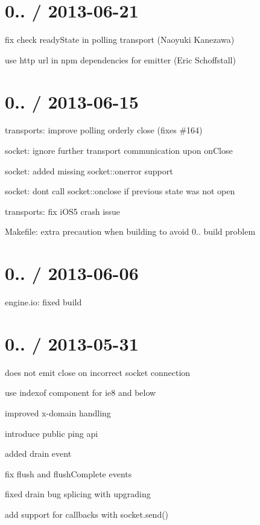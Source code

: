 \section*{0.. / 2013-\/06-\/21 }


\begin{DoxyItemize}
\item fix check ready\+State in polling transport (Naoyuki Kanezawa)
\item use http url in npm dependencies for emitter (Eric Schoffstall)
\end{DoxyItemize}

\section*{0.. / 2013-\/06-\/15 }


\begin{DoxyItemize}
\item transports\+: improve polling orderly close (fixes \#164)
\item socket\+: ignore further transport communication upon {\ttfamily on\+Close}
\item socket\+: added missing {\ttfamily socket\+::onerror} support
\item socket\+: don\textquotesingle{}t call {\ttfamily socket\+::onclose} if previous state was not {\ttfamily open}
\item transports\+: fix i\+O\+S5 crash issue
\item Makefile\+: extra precaution when building to avoid 0.. build problem
\end{DoxyItemize}

\section*{0.. / 2013-\/06-\/06 }


\begin{DoxyItemize}
\item engine.\+io\+: fixed build
\end{DoxyItemize}

\section*{0.. / 2013-\/05-\/31 }


\begin{DoxyItemize}
\item does not emit close on incorrect socket connection
\item use indexof component for ie8 and below
\item improved x-\/domain handling
\item introduce public {\ttfamily ping} api
\item added drain event
\item fix {\ttfamily flush} and {\ttfamily flush\+Complete} events
\item fixed {\ttfamily drain} bug splicing with upgrading
\item add support for callbacks with socket.\+send()
\end{DoxyItemize}

